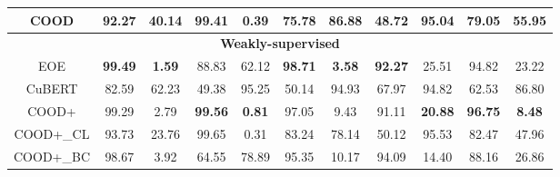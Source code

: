 \begin{table*}[]
\begin{adjustbox}{width=0.9\textwidth}
\begin{tabular}{|ccccccccccc|}
\multicolumn{1}{|c|}{COOD}               & \multicolumn{1}{c|}{\textbf{92.27}}  & \multicolumn{1}{c|}{\textbf{40.14}}  & \multicolumn{1}{c|}{\textbf{99.41}}  & \multicolumn{1}{c|}{\textbf{0.39}}   & \multicolumn{1}{c|}{\textbf{75.78}}  & \multicolumn{1}{c|}{\textbf{86.88}}  & \multicolumn{1}{c|}{48.72}           & \multicolumn{1}{c|}{\textbf{95.04}}  & \multicolumn{1}{c|}{\textbf{79.05}}  & \textbf{55.95}  \\ \hline
\multicolumn{11}{|c|}{\textbf{Weakly-supervised}}                                                                                                                                                                                                                                                                                                                                                                         \\ \hline
\multicolumn{1}{|c|}{EOE}                & \multicolumn{1}{c|}{\textbf{99.49}}  & \multicolumn{1}{c|}{\textbf{1.59}}   & \multicolumn{1}{c|}{88.83}           & \multicolumn{1}{c|}{62.12}           & \multicolumn{1}{c|}{\textbf{98.71}}  & \multicolumn{1}{c|}{\textbf{3.58}}   & \multicolumn{1}{c|}{\textbf{92.27}}  & \multicolumn{1}{c|}{25.51}           & \multicolumn{1}{c|}{94.82}           & 23.22           \\ \hline
\multicolumn{1}{|c|}{CuBERT}             & \multicolumn{1}{c|}{82.59}           & \multicolumn{1}{c|}{62.23}           & \multicolumn{1}{c|}{49.38}           & \multicolumn{1}{c|}{95.25}           & \multicolumn{1}{c|}{50.14}           & \multicolumn{1}{c|}{94.93}           & \multicolumn{1}{c|}{67.97}           & \multicolumn{1}{c|}{94.82}           & \multicolumn{1}{c|}{62.53}           & 86.80           \\ \hline
\multicolumn{1}{|c|}{COOD+}              & \multicolumn{1}{c|}{99.29}           & \multicolumn{1}{c|}{2.79}            & \multicolumn{1}{c|}{\textbf{99.56}}  & \multicolumn{1}{c|}{\textbf{0.81}}   & \multicolumn{1}{c|}{97.05}           & \multicolumn{1}{c|}{9.43}            & \multicolumn{1}{c|}{91.11}           & \multicolumn{1}{c|}{\textbf{20.88}}  & \multicolumn{1}{c|}{\textbf{96.75}}  & \textbf{8.48}   \\
\multicolumn{1}{|c|}{COOD+\_CL}          & \multicolumn{1}{c|}{93.73}           & \multicolumn{1}{c|}{23.76}           & \multicolumn{1}{c|}{99.65}           & \multicolumn{1}{c|}{0.31}            & \multicolumn{1}{c|}{83.24}           & \multicolumn{1}{c|}{78.14}           & \multicolumn{1}{c|}{50.12}           & \multicolumn{1}{c|}{95.53}           & \multicolumn{1}{c|}{82.47}           & 47.96           \\
\multicolumn{1}{|c|}{COOD+\_BC}          & \multicolumn{1}{c|}{98.67}           & \multicolumn{1}{c|}{3.92}            & \multicolumn{1}{c|}{64.55}           & \multicolumn{1}{c|}{78.89}           & \multicolumn{1}{c|}{95.35}           & \multicolumn{1}{c|}{10.17}           & \multicolumn{1}{c|}{94.09}           & \multicolumn{1}{c|}{14.40}           & \multicolumn{1}{c|}{88.16}           & 26.86           \\ \hline



\end{tabular}
\end{adjustbox}
\end{table*}
